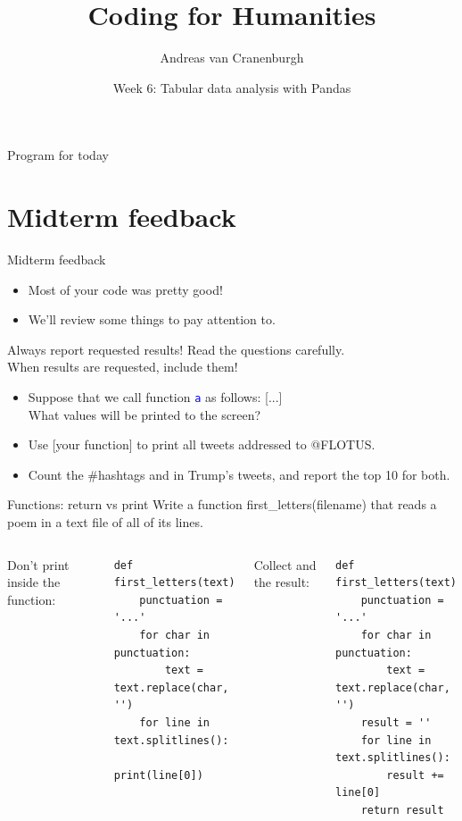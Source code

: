 \documentclass{beamer}
\title{Coding for Humanities}
\author{Andreas van Cranenburgh}
\date{Week 6: Tabular data analysis with Pandas}
\begin{document}
\maketitle




\begin{frame}{Program for today}
\tableofcontents
\end{frame}


\section{Midterm feedback}

\begin{frame}{Midterm feedback}
    \begin{itemize}
        \item Most of your code was pretty good!
        \item We'll review some things to pay attention to.
    \end{itemize}
\end{frame}

\begin{frame}{Always report requested results!}
    Read the questions carefully. \\
    When results are requested, include them!
    \begin{itemize}
        \item Suppose that we call function \textcolor{blue}{\texttt{a}}
            as follows: [...]\\
            What values will be printed to the screen?
        \item Use [your function] to print all tweets addressed to @FLOTUS.
        \item Count the \#hashtags and \@usernames in Trump's tweets, and
            report the top 10 for both.
    \end{itemize}
\end{frame}


\begin{frame}[fragile]{Functions: return vs print}
Write a function first\_letters(filename) that reads a poem in a text file
 of all of its lines.
\vspace{1em}
\begin{columns}
Don't print inside the function:
\begin{lstlisting}[style=smaller]
def first_letters(text):
    punctuation = '...'
    for char in punctuation:
        text = text.replace(char, '')
    for line in text.splitlines():
        print(line[0])
\end{lstlisting}
\pause{}
Collect and  the result: 
\begin{lstlisting}[style=smaller]
def first_letters(text):
    punctuation = '...'
    for char in punctuation:
        text = text.replace(char, '')
    result = ''
    for line in text.splitlines():
        result += line[0]
    return result
\end{lstlisting}
\end{columns}
\end{frame}
\end{document}
